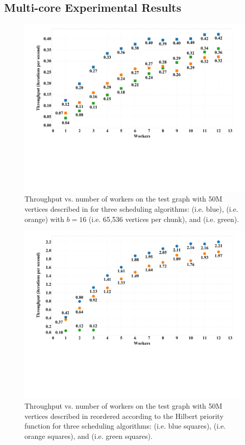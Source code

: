 \subsection{Multi-core Experimental Results}
\label{sec:empirical}

\begin{figure}[h]
\centering
\includegraphics[width=5in,clip,trim=1cm 6cm 0 0]{figures/scalability_original.pdf}
\caption{Throughput vs. number of workers on the test graph 
with 50M vertices described in 
for three scheduling algorithms:  (i.e. blue),  
(i.e. orange) with $b=16$ 
(i.e. 65,536 vertices per chunk), and  (i.e. green).
}
\label{fig:scalability_original}
\end{figure}

\begin{figure}[h]
\centering
\includegraphics[width=5in,clip,trim=1cm 6cm 0 0]{figures/scalability_reordered.pdf}
\caption{Throughput vs. number of workers on the test graph 
with 50M vertices described in  reordered
according to the Hilbert priority function
for three scheduling algorithms:  (i.e. blue squares),  (i.e. orange squares), and  (i.e. green squares).
}
\label{fig:scalability_reordered}
\end{figure}


